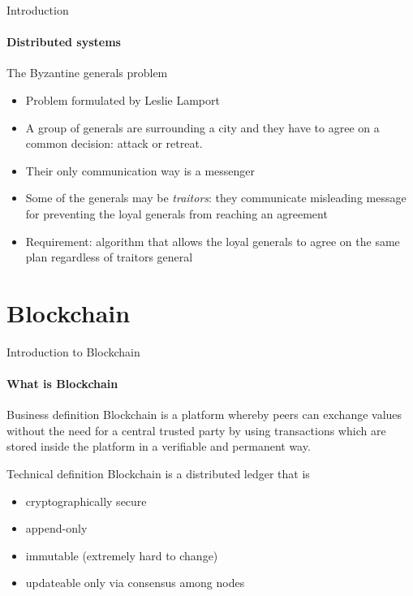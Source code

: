 \documentclass{beamer}
\begin{document}
  \begin{frame}{Introduction}
    \framesubtitle{Distributed systems}
    \begin{block}{The Byzantine generals problem}
      \begin{itemize}
        \item Problem formulated by Leslie Lamport \cite{lamport1982byzantine}
        \item A group of generals are surrounding a city and they have to agree
        on a common decision: attack or retreat.
        \item Their only communication way is a messenger
        \item Some of the generals may be \emph{traitors}: they communicate
        misleading message for preventing the loyal generals from reaching an
        agreement
        \item Requirement: algorithm that allows the loyal generals to agree
        on the same plan regardless of traitors general
      \end{itemize}
    \end{block}
  \end{frame}







  \section{Blockchain}
  \begin{frame}{Introduction to Blockchain}
    \framesubtitle{What is Blockchain}

    \begin{block}{Business definition}
      Blockchain is a platform whereby peers can exchange values without the need
      for a central trusted party by using transactions which are stored inside
      the platform in a verifiable and permanent way.
    \end{block}

    \begin{block}{Technical definition}
      Blockchain is a distributed ledger that is
      \begin{itemize}
        \item cryptographically secure
        \item append-only
        \item immutable (extremely hard to change)
        \item updateable only via consensus among nodes
      \end{itemize}
    \end{block}
  \end{frame}
\end{document}
